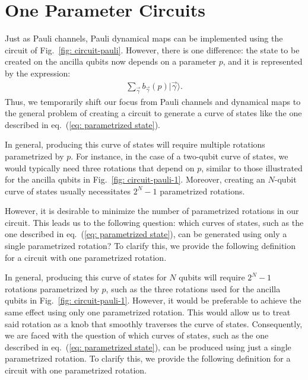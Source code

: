 \documentclass[10pt,letterpaper]{article} %
\newcommand{\fref}[1]{Fig.~\ref{#1}}
\newcommand{\eref}[1]{eq.~(\ref{#1})}
\begin{document}

\newpage
\section{One Parameter Circuits} %
\label{sec: 1PR Circuits}
 


Just as Pauli channels, Pauli dynamical maps can be implemented using the circuit
of \fref{fig: circuit-pauli}. However, there is one difference: 
the state to be created on the ancilla qubits now 
depends on a parameter $p$, and it is represented by the expression:
\begin{eqnarray}
\label{eq: parametrized state}
\sum_{\vec{\gamma}} b_{\vec{\gamma}}(p) |\vec{\gamma}\rangle.
\end{eqnarray}
Thus, we temporarily shift our focus from Pauli
channels and dynamical maps to the general problem of 
creating a circuit to generate a curve of
states like the one described in \eref{eq: parametrized state}.
 

In general, producing this curve of states will require multiple rotations
parametrized by $p$. For instance, in the case of a two-qubit curve of states,
we would typically need three rotations that depend on $p$, similar to those
illustrated for the ancilla qubits in \fref{fig: circuit-pauli-1}.
Moreover, creating an $N$-qubit curve of states
usually necessitates $2^N-1$ parametrized rotations.
 

However, it is desirable to minimize the number of parametrized rotations in our circuit.
This leads us to the following question: which curves of states,
such as the one described in \eref{eq: parametrized state}, 
can be generated using only a single parametrized rotation? 
To clarify this, we provide the following definition for a circuit with one parametrized rotation.

{\color{orange} In general, producing this curve of states for $N$ qubits will require
$2^N-1$ rotations parametrized by $p$,
such as the three rotations used for the ancilla
qubits in \fref{fig: circuit-pauli-1}.
However, it would be preferable to achieve the same effect using only one parametrized rotation. 
This would allow us to treat said rotation 
as a knob that smoothly traverses the curve of states.
Consequently, we are faced with the question of which curves of states, 
such as the one described in \eref{eq: parametrized state}, 
can be produced using just a single parametrized rotation. 
To clarify this, we provide the following definition 
for a circuit with one parametrized rotation.}
\end{document}
